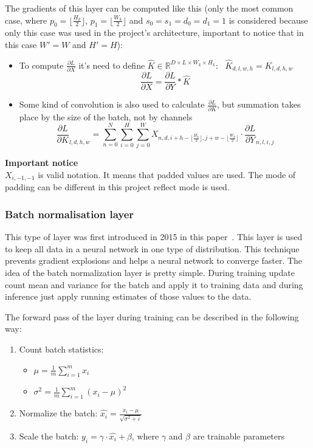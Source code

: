 The gradients of this layer can be computed like this (only the most common case, where $\displaystyle p_0 = \Big\lfloor \frac{H_k}{2} \Big\rfloor$, $\displaystyle p_1=\Big \lfloor \frac{W_k}{2} \Big\rfloor$ 
and $s_0 = s_1 = d_0 = d_1 = 1$ is considered because only this case was used in the project's architecture, important to notice that in this case $W'=W$ and $H'=H$):
\begin{itemize}
    \item To compute $\frac{\partial L}{\partial X}$ it's need to define $\widehat{K} \in \mathbb{R}^{D \times L \times W_k \times H_k}: \text{ } \widehat{K}_{d,l,w,h} = K_{l,d,h,w}$
    \[
        \displaystyle \frac{\partial L}{\partial X} = \frac{\partial L}{\partial Y} * \widehat{K}
    \]

    \item Some kind of convolution is also used to calculate $\frac{\partial L}{\partial K}$, but summation takes place by the size of the batch, not by channels 
    \[
        \frac{\partial L}{\partial K}_{l, d, h, w} = \sum\limits_{n=0}^N\sum\limits_{i=0}^H\sum\limits_{j=0}^W X_{n,d,i+h-\lfloor \frac{H_k}{2} \rfloor, j+w-\lfloor \frac{W_k}{2} \rfloor}
        \cdot \frac{\partial L}{\partial Y}_{n, l, i, j}
    \]
\end{itemize}

\textbf{Important notice} \\
$X_{i,-1,-1}$ is valid notation. It means that padded values are used. The mode of padding can be different in this project reflect mode is used.

\subsubsection{Batch normalisation layer}
This type of layer was first introduced in 2015 in this paper~\cite{batch_norm}.
This layer is used to keep all data in a neural network in one type of distribution. This technique prevents gradient explosions and 
helps a neural network to converge faster.
The idea of the batch normalization layer is pretty simple. During training update count mean and variance for the batch and apply it to training data and during inference just 
apply running estimates of those values to the data.

The forward pass of the layer during training can be described in the following way:
\begin{enumerate}
    \item Count batch statistics:
    \begin{itemize}
        \item $\mu = \displaystyle \frac{1}{m} \sum\limits_{i=1}^m x_i$
        \item $\sigma^2 = \displaystyle \frac{1}{m} \sum\limits_{i=1}^m (x_i - \mu) ^ 2$
    \end{itemize}
    \item Normalize the batch: $\hat{x_i} = \displaystyle \frac{x_i - \mu}{\sqrt{\sigma^2 + \varepsilon}}$
    \item Scale the batch: $y_i = \gamma \cdot \hat{x_i} + \beta$, where $\gamma$ and $\beta$ are trainable parameters
\end{enumerate}

